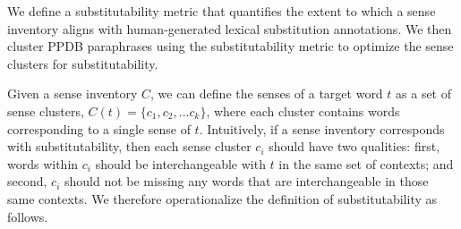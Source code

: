 \documentclass[11pt]{article}
\begin{document}
We define a substitutability metric that quantifies the extent to which a sense inventory aligns with human-generated lexical substitution annotations. We then cluster PPDB paraphrases using the substitutability metric to optimize the sense clusters for substitutability. 

Given a sense inventory $C$, we can define the senses of a target word $t$ as a set of sense clusters, $C(t) = \{c_1, c_2, \dots c_k\}$, where each cluster contains words corresponding to a single sense of $t$. Intuitively, if a sense inventory corresponds with substitutability, then each sense cluster $c_i$ should have two qualities: first, words within $c_i$ should be interchangeable with $t$ in the same set of contexts; and second, $c_i$ should not be missing any words that are interchangeable in those same contexts. We therefore operationalize the definition of substitutability as follows. 
\end{document}
